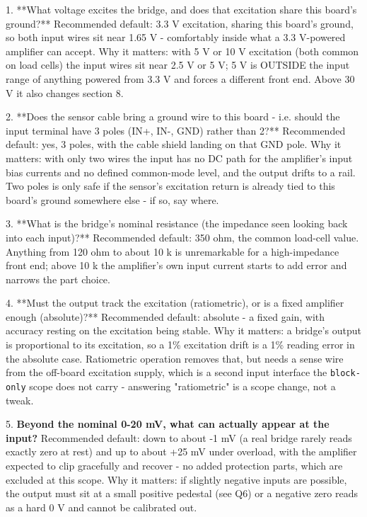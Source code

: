 \documentclass[11pt,a4paper]{article}
\begin{document}
1. {*}{*}What voltage excites the bridge, and does that excitation share this board's ground?{*}{*} Recommended default: 3.3 V excitation, sharing this board's ground, so both input wires sit near 1.65 V - comfortably inside what a 3.3 V-powered amplifier can accept. Why it matters: with 5 V or 10 V excitation (both common on load cells) the input wires sit near 2.5 V or 5 V; 5 V is OUTSIDE the input range of anything powered from 3.3 V and forces a different front end. Above 30 V it also changes section 8.

2. {*}{*}Does the sensor cable bring a ground wire to this board - i.e. should the input terminal have 3 poles (IN+, IN-, GND) rather than 2?{*}{*} Recommended default: yes, 3 poles, with the cable shield landing on that GND pole. Why it matters: with only two wires the input has no DC path for the amplifier's input bias currents and no defined common-mode level, and the output drifts to a rail. Two poles is only safe if the sensor's excitation return is already tied to this board's ground somewhere else - if so, say where.

3. {*}{*}What is the bridge's nominal resistance (the impedance seen looking back into each input)?{*}{*} Recommended default: 350 ohm, the common load-cell value. Anything from 120 ohm to about 10 k is unremarkable for a high-impedance front end; above 10 k the amplifier's own input current starts to add error and narrows the part choice.

4. {*}{*}Must the output track the excitation (ratiometric), or is a fixed amplifier enough (absolute)?{*}{*} Recommended default: absolute - a fixed gain, with accuracy resting on the excitation being stable. Why it matters: a bridge's output is proportional to its excitation, so a 1\% excitation drift is a 1\% reading error in the absolute case. Ratiometric operation removes that, but needs a sense wire from the off-board excitation supply, which is a second input interface the \texttt{block-only} scope does not carry - answering "ratiometric" is a scope change, not a tweak.

5. \textbf{Beyond the nominal 0-20 mV, what can actually appear at the input?} Recommended default: down to about -1 mV (a real bridge rarely reads exactly zero at rest) and up to about +25 mV under overload, with the amplifier expected to clip gracefully and recover - no added protection parts, which are excluded at this scope. Why it matters: if slightly negative inputs are possible, the output must sit at a small positive pedestal (see Q6) or a negative zero reads as a hard 0 V and cannot be calibrated out.
\end{document}
